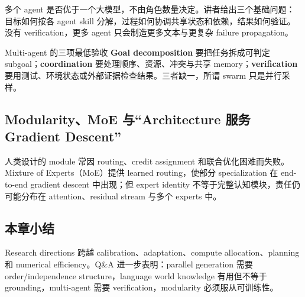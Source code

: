 多个 agent 是否优于一个大模型，不由角色数量决定。讲者给出三个基础问题：目标如何按各 agent skill 分解，过程如何协调共享状态和依赖，结果如何验证。没有 verification，更多 agent 只会制造更多文本与更复杂 failure propagation。

\begin{importantbox}{Multi-agent 的三项最低验收}
\textbf{Goal decomposition} 要把任务拆成可判定 subgoal；\textbf{coordination} 要处理顺序、资源、冲突与共享 memory；\textbf{verification} 要用测试、环境状态或外部证据检查结果。三者缺一，所谓 swarm 只是并行采样。
\end{importantbox}


\subsection{Modularity、MoE 与“Architecture 服务 Gradient Descent”}

人类设计的 module 常因 routing、credit assignment 和联合优化困难而失败。Mixture of Experts（MoE）提供 learned routing，使部分 specialization 在 end-to-end gradient descent 中出现；但 expert identity 不等于完整认知模块，责任仍可能分布在 attention、residual stream 与多个 experts 中。


\subsection{本章小结}

Research directions 跨越 calibration、adaptation、compute allocation、planning 和 numerical efficiency。Q\&A 进一步表明：parallel generation 需要 order/independence structure，language world knowledge 有用但不等于 grounding，multi-agent 需要 verification，modularity 必须服从可训练性。

